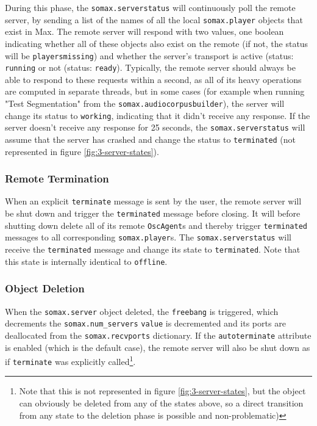 During this phase, the \texttt{somax.serverstatus} will continuously poll the remote server, by sending a list of the names of all the local \texttt{somax.player} objects that exist in Max. The remote server will respond with two values, one boolean indicating whether all of these objects also exist on the remote (if not, the status will be \texttt{playersmissing}) and whether the server's transport is active (status: \texttt{running} or not (status: \texttt{ready}). Typically, the remote server should always be able to respond to these requests within a second, as all of its heavy operations are computed in separate threads, but in some cases (for example when running "Test Segmentation" from the \texttt{somax.audiocorpusbuilder}), the server will change its status to \texttt{working}, indicating that it didn't receive any response. If the server doesn't receive any response for 25 seconds, the \texttt{somax.serverstatus} will assume that the server has crashed and change the status to \texttt{terminated} (not represented in figure \ref{fig:3-server-states}).


\subsubsection{Remote Termination}
When an explicit \texttt{terminate} message is sent by the user, the remote server will be shut down and trigger the \texttt{terminated} message before closing. It will before shutting down delete all of its remote \texttt{OscAgent}s and thereby trigger \texttt{terminated} messages to all corresponding \texttt{somax.player}s. The \texttt{somax.serverstatus} will receive the \texttt{terminated} message and change its state to \texttt{terminated}. Note that this state is internally identical to \texttt{offline}.



\subsubsection{Object Deletion}
When the \texttt{somax.server} object deleted, the \texttt{freebang} is triggered, which decrements the \texttt{somax.num\_servers} \texttt{value} is decremented and its ports are deallocated from the  \texttt{somax.recvports} dictionary. If the \texttt{autoterminate} attribute is enabled (which is the default case), the remote server will also be shut down as if \texttt{terminate} was explicitly called\footnote{Note that this is not represented in figure \ref{fig:3-server-states}, but the object can obviously be deleted from any of the states above, so a direct transition from any state to the deletion phase is possible and non-problematic)}. 


